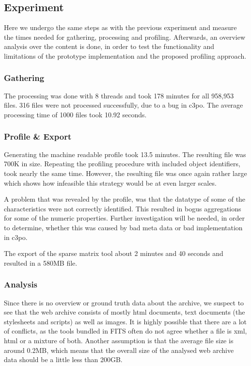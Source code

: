 \subsection{Experiment}
Here we undergo the same steps as with the previous experiment and measure the times needed for gathering, processing and profiling.
Afterwards, an overview analysis over the content is done, in order to test the functionality and limitations of the prototype implementation and the proposed profiling approach.

\subsubsection{Gathering}
The processing was done with 8 threads and took 178 minutes for  all 958,953 files. 316 files were not processed successfully, due to a bug in c3po. The average processing time of 1000 files took 10.92 seconds. 

\subsubsection{Profile \& Export}
Generating the machine readable profile took 13.5 minutes. The resulting file was 700K in size. Repeating the profiling procedure with included object identifiers, took nearly the same time. However, the resulting file was once again rather large which shows how infeasible this strategy would be at even larger scales.

A problem that was revealed by the profile, was that the datatype of some of the characteristics were not correctly identified. This resulted in bogus aggregations for some of the numeric properties. Further investigation will be needed, in order to determine, whether this was caused by bad meta data or bad implementation in c3po.

The export of the sparse matrix tool about 2 minutes and 40 seconds and resulted in a 580MB file.

\subsubsection{Analysis}
Since there is no overview or ground truth data about the archive, we suspect to see that the web archive consists of mostly html documents, text documents (the stylesheets and scripts) as well as images. It is highly possible that there are a lot of conflicts, as the tools bundled in FITS often do not agree whether a file is xml, html or a mixture of both.
Another assumption is that the average file size is around 0.2MB, which means that the overall size of the analysed web archive data should be a little less than 200GB.

